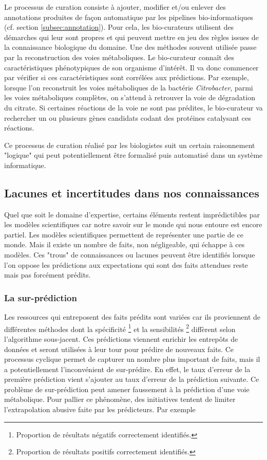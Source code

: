 \begin{refsegment}
    Le processus de curation consiste à ajouter, modifier et/ou enlever des annotations produites de façon automatique par les pipelines bio-informatiques (cf. section \cref{subsec:annotation}). Pour cela, les bio-curateurs utilisent des démarches qui leur sont propres et qui peuvent mettre en jeu des règles issues de la connaissance biologique du domaine. Une des méthodes souvent utilisée passe par la reconstruction des voies métaboliques. Le bio-curateur connaît des caractéristiques phénotypiques de son organisme d’intérêt. Il va donc commencer par vérifier si ces caractéristiques sont corrélées aux prédictions. Par exemple, lorsque l’on reconstruit les voies métaboliques de la bactérie \textit{Citrobacter}, parmi les voies métaboliques complètes, on s’attend à retrouver la voie de dégradation du citrate. Si certaines réactions de la voie ne sont pas prédites, le bio-curateur va rechercher un ou plusieurs gènes candidats codant des protéines catalysant ces réactions.
    
    Ce processus de curation réalisé par les biologistes suit un certain raisonnement "logique" qui peut potentiellement être formalisé puis automatisé dans un système informatique.
    
    \subsection{Lacunes et incertitudes dans nos connaissances}\label{subsec:lacunes}
    
    Quel que soit le domaine d’expertise, certains éléments restent imprédictibles par les modèles scientifiques car notre savoir sur le monde qui nous entoure est encore partiel. Les modèles scientifiques permettent de représenter une partie de ce monde. Mais il existe un nombre de faits, non négligeable, qui échappe à ces  modèles. Ces "trous" de connaissances ou lacunes peuvent être identifiés lorsque l’on oppose les prédictions aux expectations qui sont des faits attendues reste mais pas forcément prédits.
    
    \subsubsection{La sur-prédiction}
    
    Les ressources qui entreposent des faits prédits sont variées car ils proviennent de différentes méthodes dont la spécificité \footnote{Proportion de résultats négatifs correctement identifiés.} et la sensibilités \footnote{Proportion de résultats positifs correctement identifiés.} diffèrent selon l’algorithme sous-jacent. Ces prédictions viennent enrichir les entrepôts de données et seront utilisées à leur tour pour prédire de nouveaux faits. Ce processus cyclique permet de capturer un nombre plus important de faits, mais il a potentiellement l’inconvénient de sur-prédire. En effet, le taux d’erreur de la première prédiction vient s’ajouter au taux d’erreur de la prédiction suivante. Ce problème de sur-prédiction peut amener faussement à la prédiction d'une voie métabolique. Pour pallier ce phénomène, des initiatives tentent de limiter l’extrapolation abusive faite par les prédicteurs. Par exemple \citeauthor{pfeiffer2015manual}
    

\end{refsegment}
